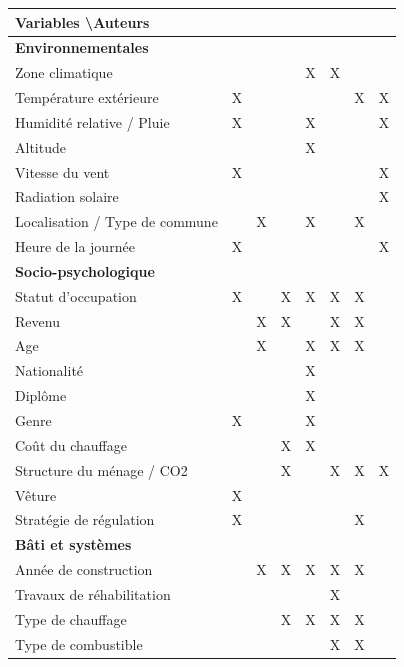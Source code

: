 \begin{table} [H]
\centering
\begin{tabular}{|l||c|c|c|c|c|c|c|}
\hline
\textbf{Variables \textbackslash Auteurs} & \cite{Annex-53-1} & \cite{Maresca-09} & \cite{Devaliere-11} & \cite{Cavailhes-11} & \cite{Penot-Antoniou-13} & \cite{Kelly-13} & \cite{Andersen-09} \\
\hline
\hline \rowcolor{gray}\textbf{Environnementales} & \multicolumn{7}{c}{} \\
\hline Zone climatique & & & & X & X & & \\
\hline Température extérieure & X & & & & & X & X \\
\hline Humidité relative / Pluie & X & & & X & & & X \\
\hline Altitude & & & & X & & & \\
\hline Vitesse du vent & X & & & & & & X \\
\hline Radiation solaire & & & & & & & X \\
\hline Localisation / Type de commune & & X & & X & & X & \\
\hline Heure de la journée & X & & & & & & X \\
\hline \rowcolor{gray} \textbf{Socio-psychologique} & \multicolumn{7}{c}{} \\
\hline Statut d'occupation & X & & X & X & X & X &  \\
\hline Revenu & & X & X & & X & X & \\
\hline Age & & X & & X & X & X & \\
\hline Nationalité & & & & X & & & \\
\hline Diplôme & & & & X & & & \\
\hline Genre & X & & & X & & & \\
\hline Coût du chauffage & & & X & X & & & \\
\hline Structure du ménage / CO2 & & & X & & X & X & X \\
\hline Vêture & X & & & & & & \\
\hline Stratégie de régulation & X & & & & & X & \\
\hline \rowcolor{gray}\textbf{Bâti et systèmes} & \multicolumn{7}{c}{} \\
\hline Année de construction & & X & X & X & X & X & \\
\hline Travaux de réhabilitation & & & & & X & & \\
\hline Type de chauffage & & & X & X & X & X & \\
\hline Type de combustible & & & & & X & X & \\

\end{tabular}
\end{table}
